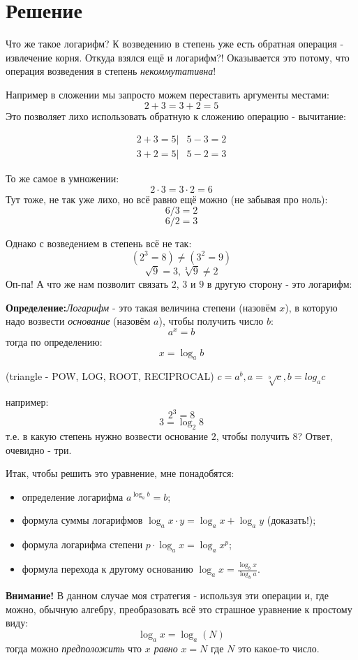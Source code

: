 \documentclass{article}
\begin{document}
\section{Решение}
Что же такое логарифм? К возведению в степень уже есть обратная операция - извлечение корня. Откуда взялся ещё и логарифм?! Оказывается это потому, что операция возведения в степень \textit{некоммутативна}!

Например в сложении мы запросто можем переставить аргументы местами:
$$2+3=3+2 = 5$$
Это позволяет лихо использовать обратную к сложению операцию - вычитание:


\begin{align*} 
2+3=5 | & 5-3=2 \\
3+2=5 | & 5-2=3
\end{align*}

То же самое в умножении:
$$2\cdot{}3=3\cdot{}2=6$$
Тут тоже, не так уже лихо, но всё равно ещё можно (не забывая про ноль):
$$ 6/3=2 $$
$$ 6/2=3 $$

Однако с возведением в степень всё не так:
$$(2^3=8) \ne (3^2=9)$$
$$\sqrt{9}=3, \sqrt[3]{9} \ne 2$$
Оп-па! А что же нам позволит связать $2$, $3$ и $9$ в другую сторону - это логарифм: 

\textbf{Определение:}\textit{Логарифм} - это такая величина степени (назовём $x$), в которую надо возвести \textit{основание} (назовём $a$), чтобы получить число $b$:
$$a^x=b$$
тогда по определению:
$$x=\log_{a}{b}$$

(triangle - POW, LOG, ROOT, RECIPROCAL)
$c=a^b, a=\sqrt[b]{c}, b=log_a{c}$

например:
$$2^3=8$$
$$3=\log_{2}{8}$$
т.е. в какую степень нужно возвести основание $2$, чтобы получить $8$? Ответ, очевидно - три.

Итак, чтобы решить это уравнение, мне понадобятся:
\begin{itemize}
    \item определение логарифма $a^{\log_{a}{b}}=b$;
    \item формула суммы логарифмов $\log_{a}{x\cdot{}y}=\log_{a}{x}+\log_{a}{y}$ (доказать!);
    \item формула логарифма степени $p\cdot\log_{a}{x}=\log_{a}{x^p}$;
    \item формула перехода к другому основанию $\log_{a}{x}=\frac{\log_{b}{x}}{\log_{b}{a}}$.
\end{itemize}

\textbf{Внимание! } В данном случае моя стратегия - используя эти операции и, где можно, обычную алгебру, преобразовать всё это страшное уравнение к простому виду:
$$\log_{a}{x}=\log_{a}{(N)}$$
тогда можно \textit{предположить} что \textit{$x$ равно} $x=N$ где $N$ это какое-то число.
\end{document}
